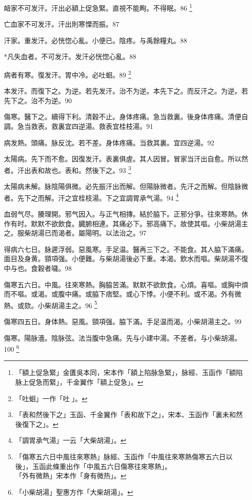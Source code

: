 衄家不可发汗。汗出必額上促急{\khaaitp 緊}。直視不能眴。不得眠。86
	\footnote{「額上促急緊」金匱吳本同，宋本作「額上陷脉急緊」，脉經、玉函作「額陷脉上促急而緊」，千金翼作「額上促急」。}

亡血家不可发汗。汗出則寒慄而振。87

汗家。重发汗。必恍惚心亂。小便已。陰疼。与禹餘糧丸。88

*凡失血者。不可发汗。发汗必恍惚心亂。{\gaoben}88

病者有寒。復发汗。胃中冷。必吐蛔。89
	\footnote{「吐蛔」一作「吐{\sungtpii 𠱘}」。}

本发汗。而復下之。为逆。若先发汗。治不为逆。本先下之。而反汗之。为逆。若先下之。治不为逆。90

傷寒。醫下之。續得下利。清穀不止。身体疼痛。急当救裏。後身体疼痛。清便自調。急当救表。救裏宜四逆湯。救表宜桂枝湯。91

病发熱。頭痛。脉反沈。若不差。身体疼痛。当救其裏。宜四逆湯。92

太陽病。先下而不愈。因復发汗。表裏俱虗。其人因冒。冒家当汗出自愈。所以然者。汗出表和故也。表和。然後下之。93
	\footnote{「表和然後下之」玉函、千金翼作「表和故下之」，宋本、玉函作「裏未和然後復下之」。}

太陽病未解。脉陰陽俱微。必先振汗出而解。但陽{\khaaitp 脉}微者。先汗之而解。但陰{\khaaitp 脉}微者。先下之而解。汗之宜桂枝湯。下之宜{\khaaitp 調胃}承气湯。94
	\footnote{「調胃承气湯」一云「大柴胡湯」。}

血弱气尽。腠理開。邪气因入。与正气相摶。結於脇下。正邪分爭。往來寒熱。休作有时。默默不欲飲食。臓腑相連。其痛必下。邪高痛下。故使其嘔。小柴胡湯主之。服柴胡湯已而渴者。屬陽明。以法治之。97

得病六七日。脉遲浮弱。惡風寒。手足温。醫再三下之。不能食。其人脇下滿{\khaaitp 痛}。面目及身黄。頸項强。小便難。与柴胡湯後必下重。本渴。飲水而嘔。柴胡{\khaaitp 湯}不復中与也。食穀者噦。98

傷寒五六日。中風。往來寒熱。胸脇苦滿。默默不欲飲食。心煩。喜嘔。或胸中煩而不嘔。或渴。或腹中痛。或脇下痞堅。或心下悸。小便不利。或不渴。外有微熱。或欬。小柴胡湯主之。96
	\footnote{「傷寒五六日中風往來寒熱」脉經、玉函作「中風往來寒熱傷寒五六日以後」，玉函此條重出作「中風五六日傷寒往來寒熱」。\\「外有微熱」宋本作「身有微热」。}

傷寒四五日。身{\khaaitp 体}熱。惡風。頸項强。脇下滿。手足温而渴。小柴胡湯主之。99

傷寒。陽脉濇。陰脉弦。法当腹中急痛。先与小建中湯。不差者。与小柴胡湯。100
	\footnote{「小柴胡湯」聖惠方作「大柴胡湯」。}

